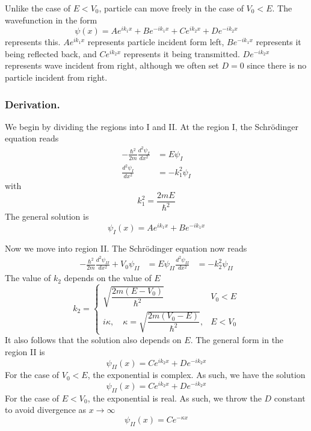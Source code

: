 \documentclass[../../../main.tex]{subfiles}
\begin{document}
Unlike the case of $E<V_0$, particle can move freely in the case of $V_0<E$.
The wavefunction in the form
\begin{equation*}
    \psi(x)=Ae^{ik_1x}+Be^{-ik_1x}+Ce^{ik_2 x}+De^{-ik_2x}    
\end{equation*}
represents this.
$Ae^{ik_1x}$ represents particle incident form left, $Be^{-ik_1x}$ represents it being reflected back, and $Ce^{ik_2 x}$ represents it being transmitted.
$De^{-ik_2x}$ represents wave incident from right, although we often set $D=0$ since there is no particle incident from right.

\subsubsection{Derivation.}
We begin by dividing the regions into I and II.
At the region I, the Schrödinger equation reads
\begin{align*}
    -\frac{\hbar^2}{2m} \frac{d^2 \psi_{I}}{dx^2} & =  E \psi_I      \\
    \frac{d^2 \psi_{I}}{dx^2}                     & = - k_1^2 \psi_{I}
\end{align*}
with
\begin{equation*}
    k_1^2 =\frac{2 m E}{\hbar^2}
\end{equation*}
The general solution is
\begin{equation*}
    \psi_I(x) = A e^{i k_1 x} + B e^{-i k_1 x}
\end{equation*}

Now we move into region II.
The Schrödinger equation now reads
\begin{align*}
    -\frac{\hbar^2}{2m} \frac{d^2 \psi_{II}}{dx^2} + V_0 \psi_{II} & =  E \psi_{II}
    \frac{d^2 \psi_{II}}{dx^2}                                  & = - k_2^2 \psi_{II}
\end{align*}
The value  of $k_2$ depends on the value of $E$
\begin{equation*}
    k_2 =
    \begin{cases}
        \sqrt{\dfrac{2 m (E - V_0)}{\hbar^2}}&V_0<E\\
        i \kappa, \quad \kappa = \sqrt{\dfrac{2 m (V_0 - E)}{\hbar^2}}, & E < V_0 
    \end{cases}
\end{equation*}
It also follows that the solution also depends on $E$.
The general form in the region II is
\begin{equation*}
    \psi_{II}(x)=C e^{i k_2 x} + D e^{-i k_2 x} 
\end{equation*}
For the case of $V_0<E$, the exponential is complex. 
As such, we have the solution 
\begin{equation*}
    \psi_{II}(x) = C e^{i k_2 x} + D e^{-i k_2 x}
\end{equation*}
For the case of $E<V_0$, the exponential is real.
As such, we throw the $D$ constant to avoid divergence as $x \rightarrow \infty$
\begin{equation*}
    \psi_{II}(x) =C e^{-\kappa x}
\end{equation*}
\end{document}
